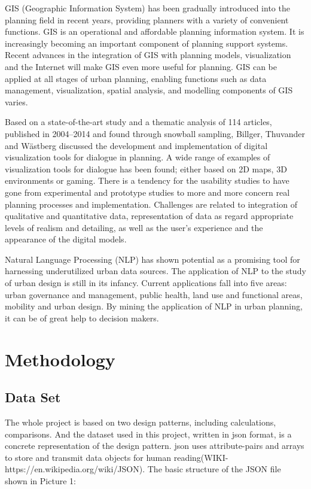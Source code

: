 GIS (Geographic Information System) has been gradually introduced into the planning field in recent years, providing planners with a variety of convenient functions.\cite{bib7} GIS is an operational and affordable planning information system. It is increasingly becoming an important component of planning support systems. Recent advances in the integration of GIS with planning models, visualization and the Internet will make GIS even more useful for planning. GIS can be applied at all stages of urban planning, enabling functions such as data management, visualization, spatial analysis, and modelling components of GIS varies.

Based on a state-of-the-art study and a thematic analysis of 114 articles, published in 2004–2014 and found through snowball sampling, Billger, Thuvander and Wästberg\cite{bib8} discussed the development and implementation of digital visualization tools for dialogue in planning. A wide range of examples of visualization tools for dialogue has been found; either based on 2D maps, 3D environments or gaming. There is a tendency for the usability studies to have gone from experimental and prototype studies to more and more concern real planning processes and implementation. Challenges are related to integration of qualitative and quantitative data, representation of data as regard appropriate levels of realism and detailing, as well as the user’s experience and the appearance of the digital models.

 Natural Language Processing (NLP) has shown potential as a promising tool for harnessing underutilized urban data sources\cite{bib9}. The application of NLP to the study of urban design is still in its infancy. Current applications fall into five areas: urban governance and management, public health, land use and functional areas, mobility and urban design. By mining the application of NLP in urban planning, it can be of great help to decision makers.


\section* {Methodology}
\subsection* {Data Set}
The whole project is based on two design patterns, including calculations, comparisons. And the dataset used in this project, written in json format, is a concrete representation of the design pattern. json uses attribute-pairs and arrays to store and transmit data objects for human reading(WIKI-https://en.wikipedia.org/wiki/JSON). The basic structure of the JSON file shown in Picture 1:

